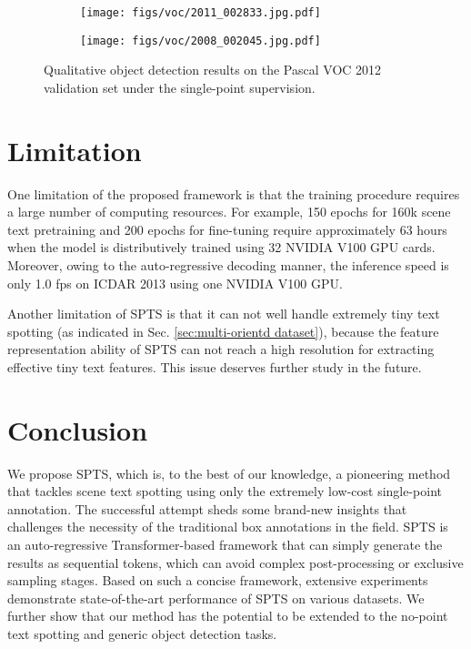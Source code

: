 \documentclass[sigconf]{acmart}
\begin{document}
\begin{figure}[t!]
\centering
    \begin{subfigure}{0.4\linewidth}
        \texttt{[image: figs/voc/2011\_002833.jpg.pdf]}
    \end{subfigure}
    \begin{subfigure}{0.4\linewidth}
        \texttt{[image: figs/voc/2008\_002045.jpg.pdf]}
    \end{subfigure}
    \caption{Qualitative object detection results on the Pascal VOC 2012 validation set under the single-point supervision. }
    \label{fig:object_detection}
\end{figure}

\section{Limitation}
\label{sec:discussion}


One limitation of the proposed framework is that the training procedure requires a large number of computing resources. For example, 150 epochs for 160k scene text pretraining and 200 epochs for fine-tuning require approximately 63 hours when the model is distributively trained using 32 NVIDIA V100 GPU cards. Moreover, owing to the auto-regressive decoding manner, the inference speed is only 1.0 fps on ICDAR 2013 using one NVIDIA V100 GPU.


Another limitation of SPTS is that it can not well handle extremely tiny text spotting (as indicated in Sec. \ref{sec:multi-orientd dataset}), because the feature representation ability of SPTS can not reach a high resolution for extracting effective tiny text features. This issue deserves further study in the future.



\section{Conclusion}
We propose SPTS, which is, to the best of our knowledge, a pioneering method that tackles scene text spotting using only the extremely low-cost single-point annotation. The successful attempt sheds some brand-new insights that challenges the necessity of the traditional box annotations in the field.
SPTS is an auto-regressive Transformer-based framework that can simply generate the results as sequential tokens, which can avoid complex post-processing or exclusive sampling stages. 
Based on such a concise framework, extensive experiments demonstrate state-of-the-art performance of SPTS on various datasets.
We further show that our method has the potential to be extended to the no-point text spotting and generic object detection tasks. 
\end{document}
